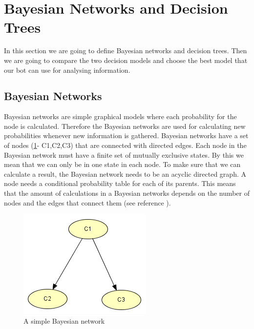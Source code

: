 \section{Bayesian Networks and Decision Trees}
In this section we are going to define Bayesian networks and decision trees. Then we are going to compare the two decision models and choose the best model that our bot can use for analysing information.

\subsection{Bayesian Networks}
	Bayesian networks are simple graphical models where each probability for the node is calculated. Therefore the Bayesian networks are used for calculating new probabilities whenever new information is gathered. Bayesian networks have a set of nodes (\ref{fig:basicbayesian}- C1,C2,C3) that are connected with directed edges. Each node in the Bayesian network must have a finite set of mutually exclusive states. By this we mean that we can only be in one state in each node. To make sure that we can calculate a result, the Bayesian network needs to be an acyclic directed graph. A node needs a conditional probability table for each of its parents. This means that the amount of calculations in a Bayesian networks depends on the number of nodes and the edges that connect them (see reference \cite[p. 33]{Bayesian_Network_Design}).
	
\begin{figure}[H]
\begin{center}
\includegraphics{Figures/BayesianPictures/BasicBayesianNetwork.png}
\caption{A simple Bayesian network}
\label{fig:basicbayesian}
\end{center}
\end{figure}


